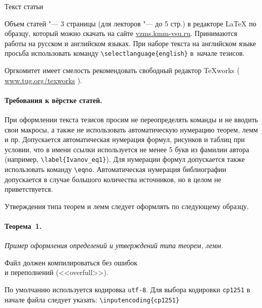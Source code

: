 \documentclass{vzmsthesis}
\begin{document}

\vzmscaption


Текст статьи


Объем статей "--- 3 страницы (для лекторов "--- до 5 стр.)
в редакторе \LaTeX{} по образцу, который можно скачать на
сайте \href{https://vzms.kmm-vsu.ru}{vzms.kmm-vsu.ru}.
Принимаются работы на русском и английском языках.
При наборе текста на английском языке просьба использовать команду
\verb`\selectlanguage{english}`
в~начале тезисов.

Оргкомитет имеет смелость рекомендовать свободный редактор TeXworks
( \href{https://www.tug.org/texworks/}{www.tug.org/texworks} ).

\paragraph{Требования к вёрстке статей.}
При оформлении текста тезисов просим не переопределять команды и не
вводить свои макросы, а также не использовать автоматическую
нумерацию теорем, лемм и пр.
Допускается автоматическая нумерация формул, рисунков и таблиц
при условии, что в имени ссылки используется не менее 5 букв из фамилии автора
(например, \verb`\label{Ivanov_eq1}`).
Для нумерации формул допускается также использовать команду \verb"\eqno".
Автоматическая нумерация библиографии допускается в случае большого количества источников,
но в целом не приветствуется.

Утверждения типа теорем и лемм следует оформлять по следующему
образцу.

\paragraph{Теорема~1.} {\it
	Пример оформления определений и утверждений типа теорем, лемм.
}

\begin{center}
	Файл должен компилироваться без ошибок \\
	и переполнений (<<overfull>>).
\end{center}

По умолчанию используется кодировка \verb`utf-8`.
Для выбора кодировки \verb`cp1251` в начале файла следует указать:
\verb`\inputencoding{cp1251}`
\end{document}
